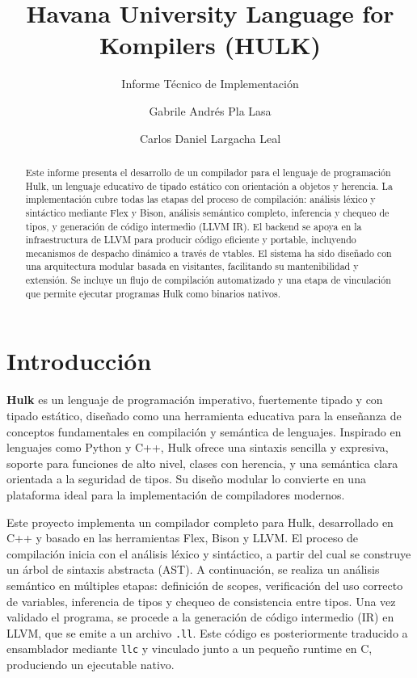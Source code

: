 \documentclass{llncs}
\title{Havana University Language for Kompilers (HULK)}
\subtitle{Informe Técnico de Implementación}
\author{
	Gabrile Andrés Pla Lasa\inst{1} \and
	Carlos Daniel Largacha Leal\inst{2}
}
\institute{
	Universidad de La Habana \email{gabriel.aplasa@estudiantes.matcom.uh.cu}\\
	\and
	Universidad de La Habana \email{carlos.dlargacha@estudiantes.matcom.uh.cu}
}
\begin{document}
	
	\maketitle
	
	\begin{abstract}
		Este informe presenta el desarrollo de un compilador para el lenguaje de programación Hulk, un lenguaje educativo de tipado estático con orientación a objetos y herencia. La implementación cubre todas las etapas del proceso de compilación: análisis léxico y sintáctico mediante Flex y Bison, análisis semántico completo, inferencia y chequeo de tipos, y generación de código intermedio (LLVM IR). El backend se apoya en la infraestructura de LLVM para producir código eficiente y portable, incluyendo mecanismos de despacho dinámico a través de vtables. El sistema ha sido diseñado con una arquitectura modular basada en visitantes, facilitando su mantenibilidad y extensión. Se incluye un flujo de compilación automatizado y una etapa de vinculación que permite ejecutar programas Hulk como binarios nativos.
	\end{abstract}
		
	

	\section{Introducción}

	\textbf{Hulk} es un lenguaje de programación imperativo, fuertemente tipado y con tipado estático, diseñado como una herramienta educativa para la enseñanza de conceptos fundamentales en compilación y semántica de lenguajes. Inspirado en lenguajes como Python y C++, Hulk ofrece una sintaxis sencilla y expresiva, soporte para funciones de alto nivel, clases con herencia, y una semántica clara orientada a la seguridad de tipos. Su diseño modular lo convierte en una plataforma ideal para la implementación de compiladores modernos.

	Este proyecto implementa un compilador completo para Hulk, desarrollado en C++ y basado en las herramientas Flex, Bison y LLVM. El proceso de compilación inicia con el análisis léxico y sintáctico, a partir del cual se construye un árbol de sintaxis abstracta (AST). A continuación, se realiza un análisis semántico en múltiples etapas: definición de scopes, verificación del uso correcto de variables, inferencia de tipos y chequeo de consistencia entre tipos. Una vez validado el programa, se procede a la generación de código intermedio (IR) en LLVM, que se emite a un archivo \texttt{.ll}. Este código es posteriormente traducido a ensamblador mediante \texttt{llc} y vinculado junto a un pequeño runtime en C, produciendo un ejecutable nativo.
\end{document}
